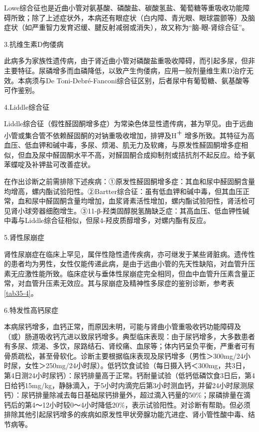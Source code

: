 Lowe综合征也是近曲小管对氨基酸、磷酸盐、碳酸氢盐、葡萄糖等重吸收功能障碍所致；除了上述症状外，本病还有眼症状（白内障、青光眼、眼球震颤等）及脑症状（如严重智力发育迟缓、腱反射减弱或消失），故又称为“脑-眼-肾综合征”。

\hypertarget{text00273.htmlux5cux23CHP35-2-2-2-2-5-3}{}
3.抗维生素D佝偻病

此病多为家族性遗传病，由于肾近曲小管对磷酸盐重吸收障碍，而引起多尿，但非主要特征。尿磷增多而血磷降低，以致产生佝偻病，应用一般剂量维生素D治疗无效。本病须与De
Toni-Debré-Fanconi综合征区别，后者尿中有葡萄糖、氨基酸等可作鉴别。

\hypertarget{text00273.htmlux5cux23CHP35-2-2-2-2-5-4}{}
4.Liddle综合征

Liddle综合征（假性醛固酮增多症）为常染色体显性遗传病，甚为罕见。由于远曲小管或集合管不依赖醛固酮的对钠重吸收增加，排钾及H\textsuperscript{＋}
增多所致。其特征为高血压、低血钾和碱中毒，多尿、烦渴、肌无力及软瘫，与原发性醛固酮增多症相似，但血及尿中醛固酮水平不高，对醛固酮合成抑制剂或拮抗剂不起反应。给予氨苯蝶啶及补钾盐可改善症状。

在作出诊断之前需排除下述疾病：①原发性醛固酮增多症：其血和尿中醛固酮含量均增高，螺内酯试验阳性。②Bartter综合征：虽有低血钾和碱中毒，但其血压正常，血和尿中醛固酮含量均增加，血浆肾素活性增加，螺内酯试验阳性，肾活检可见肾小球旁器细胞增生。③11-β-羟类固醇脱氢酶缺乏症：其高血压、低血钾性碱中毒与Liddle综合征相似，但尿4-羟皮质醇增多，对螺内酯有反应。

\hypertarget{text00273.htmlux5cux23CHP35-2-2-2-2-5-5}{}
5.肾性尿崩症

肾性尿崩症在临床上罕见，属伴性隐性遗传疾病，亦可继发于某些肾脏病。遗传性的患者均为男性，女性仅能传递此病，是由于远曲小管的先天性缺陷，对血管升压素无应激性能所致。临床症状与垂体性尿崩症完全相同，但血中血管升压素含量正常，对血管升压素无效应。其与尿崩症及精神性多尿症的鉴别诊断，参考表\ref{tab35-4}。

\hypertarget{text00273.htmlux5cux23CHP35-2-2-2-2-5-6}{}
6.特发性高钙尿症

本病尿钙增多，血钙正常，而原因未明，可能与肾曲小管重吸收钙功能障碍及（或）肠道吸收钙亢进以致尿钙增多。典型临床表现：由于尿钙增多，大多数患者有多尿、烦渴、多饮，尿路结石、肾绞痛、血尿等；体内钙呈负平衡，严重者可有骨质疏松，甚至骨软化。诊断主要根据临床表现及尿钙增多（男性＞300mg/24小时尿，女性＞250mg/24小时尿）。低钙饮食试验（每日摄入钙＜300mg，共3日，第4日测24小时尿钙）：尿钙排量高于正常。钙耐量试验（低钙低磷饮食3日后，第4日给钙15mg/kg，静脉滴入，于5小时内滴完后第3小时测血钙，并留24小时尿测尿钙）：尿钙排量除减去每日基础尿钙排量外，超过滴入钙量的50\%；尿磷排量在滴钙后的第4～12小时较0～4小时降低20\%，表示试验阳性。对诊断有帮助。但必须排除其他引起尿钙增多的疾病如原发性甲状旁腺功能亢进症、肾小管性酸中毒、结节病等。

